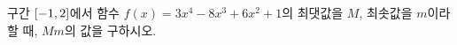 구간 $[-1{,}\mkern3mu\mathopen{}2]$에서 함수 $f(x)=3x^4-8x^3+6x^2+1$의 최댓값을 $M$, 최솟값을 $m$이라 할 때, $Mm$의 값을 구하시오.
